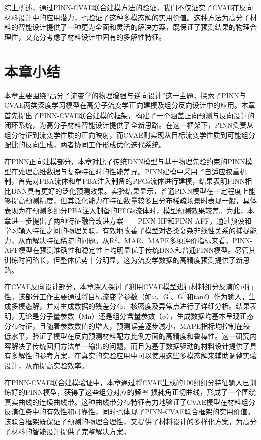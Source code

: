 综上所述，通过PINN-CVAE联合建模方法的验证，我们不仅证实了CVAE在反向材料设计中的应用潜力，也验证了这种多模态解的实用价值。这种方法为高分子材料的智能设计提供了一种更为全面和灵活的解决方案，既保证了预测结果的物理合理性，又充分考虑了材料设计中固有的多解性特征。



\section{本章小结}
本章主要围绕“高分子流变学的物理增强与逆向设计”这一主题，探索了PINN与CVAE两类深度学习模型在高分子流变学正向建模及组分反向设计中的应用。本章首先提出了PINN-CVAE联合建模的框架，构建了一个涵盖正向预测与反向设计的闭环系统，为高分子材料智能设计提供了全新思路。在这一框架下，PINN负责从组分特征到流变学性质的正向映射，而CVAE则实现从目标流变学性质到可能组分配比的反向生成，两者协同工作形成优化迭代系统。

在PINN正向建模部分，本章对比了传统DNN模型与基于物理先验约束的PINN模型在处理高维数据与复杂特征时的性能差异。PINN建模中采用了自适应权重机制，首先对PBA流体和单PBA注入制备的PFGs流体进行建模，结果表明PINN相比DNN具有更好的泛化预测效果。实验结果显示，普通PINN模型在一定程度上能够提高预测精度，但其泛化能力在特征数量较多且分布稀疏场景时表现一般，具体表现为在预测多组分PBA注入制备的PFGs流体时，模型预测效果较差。为此，本章进一步提出了两种特征融合改进方案——PINN-HP和PINN-AFF，通过预设和学习输入特征之间的物理关联，有效地改善了模型对各类复杂非线性关系的捕捉能力，从而解决特征稀疏的问题。从R$^2$、MAE、MAPE多项评价指标来看，PINN-AFF模型在预测准确性和稳定性上均明显优于传统DNN和普通PINN模型。尽管其训练时间略长，但整体优势十分明显，这为流变学数据的高精度预测提供了新思路。

在CVAE反向设计部分，本章深入探讨了利用CVAE模型进行材料组分反演的可行性。该部分工作主要通过将目标流变学参数（如$\omega$、$\mathrm{G^{\prime}}$、$\mathrm{G^{\prime\prime}}$和tan$\delta$）作为输入，生成多模态解，并对生成数据的残差分布、核密度及异常点进行了详细分析。结果表明，无论是分子量参数（Mn）还是组分含量参数（$\phi$），生成数据均基本呈现正态分布特征，且随着参数数值的增大，预测误差逐步减小，MAPE指标均控制在较低水平，验证了模型在反向预测材料配方比例方面的高精度和鲁棒性。这一研究内容解决了传统回归方法单一输出的问题，而且为基于数据驱动的材料设计提供了具有多解性的参考方案，在真实的实验应用中可以使用这些多模态解来辅助调整实验设计，从而提高实验效率。

在PINN-CVAE联合建模验证中，本章通过将CVAE生成的100组组分特征输入已训练好的PINN模型，获得了这些组分对应的频率-损耗角正切曲线，形成了一个围绕真实曲线的连续曲线带。这种曲线带分布特征有力地验证了CVAE模型在材料组分反演任务中的有效性和可靠性，同时也体现了PINN-CVAE联合框架的实用价值。该联合框架既保证了预测的物理合理性，又提供了材料设计的多样化方案，为高分子材料的智能设计提供了完整解决方案。

